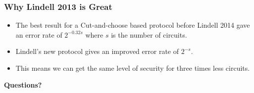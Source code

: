 \documentclass{beamer}
\begin{document}
	\begin{frame}
		\frametitle{Why Lindell 2013 is Great}
		\begin{itemize}
			\item The best result for a Cut-and-choose based protocol before Lindell 2014 gave an error rate of $2^{-0.32s}$ where $s$ is the number of circuits.
			\item Lindell's new protocol gives an improved error rate of $2^{-s}$.
			\item This means we can get the same level of security for three times less circuits.
		\end{itemize}
	\end{frame}

	
	\begin{frame}
		\begin{center}
			\textbf{ \LARGE Questions?}
		\end{center}

	\end{frame}

% 
% 
% 
% 
\end{document}
